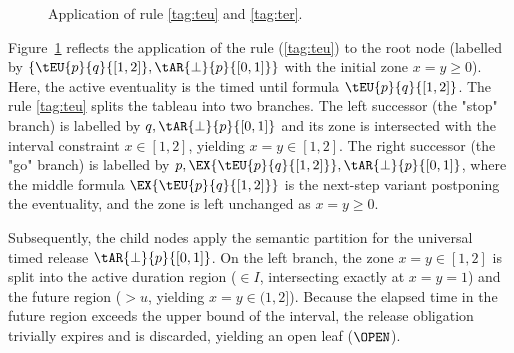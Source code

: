 \begin{figure}[th]
\caption{ Application of rule \ref{tag:teu} and \ref{tag:ter}.}\label{fig:example3}
\end{figure}



\begin{example}
Figure~\ref{fig:example3} reflects the application of the rule (\ref{tag:teu}) to the root node (labelled by $\{\tEU{p}{q}{[1,2]}, \tAR{\bot}{p}{[0,1]}\}$ with the initial zone $x=y \ge 0$). Here, the active eventuality is the timed until formula $\tEU{p}{q}{[1,2]}$. The rule \ref{tag:teu} splits the tableau into two branches. The left successor (the "stop" branch) is labelled by $q, \tAR{\bot}{p}{[0,1]}$ and its zone is intersected with the interval constraint $x \in [1,2]$, yielding $x=y \in [1,2]$. The right successor (the "go" branch) is labelled by $p, \EX{\tEU{p}{q}{[1,2]}}, \tAR{\bot}{p}{[0,1]}$, where the middle formula $\EX{\tEU{p}{q}{[1,2]}}$ is the next-step variant postponing the eventuality, and the zone is left unchanged as $x=y \ge 0$.

Subsequently, the child nodes apply the semantic partition for the universal timed release $\tAR{\bot}{p}{[0,1]}$. On the left branch, the zone $x=y \in [1,2]$ is split into the active duration region ($\in I$, intersecting exactly at $x=y=1$) and the future region ($>u$, yielding $x=y \in (1,2]$). Because the elapsed time in the future region exceeds the upper bound of the interval, the release obligation trivially expires and is discarded, yielding an open leaf ($\OPEN$).
\end{example}